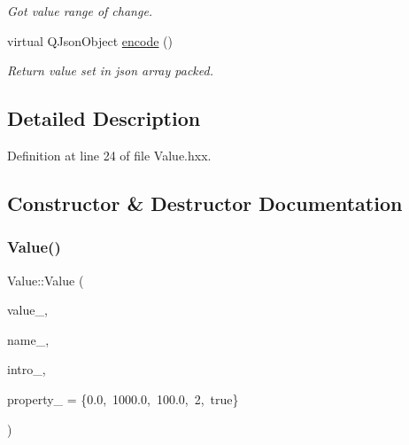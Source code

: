 \begin{DoxyCompactItemize}
\begin{DoxyCompactList}\small\item\em Got value range of change. \end{DoxyCompactList}\item 
\mbox{\label{classeven_1_1_value_af3d95249153710e93b08bfb8627f068d}} 
virtual Q\+Json\+Object \mbox{\hyperlink{classeven_1_1_value_af3d95249153710e93b08bfb8627f068d}{encode}} ()
\begin{DoxyCompactList}\small\item\em Return value set in json array packed. \end{DoxyCompactList}\end{DoxyCompactItemize}


\subsection{Detailed Description}


Definition at line 24 of file Value.\+hxx.



\subsection{Constructor \& Destructor Documentation}
\mbox{\label{classeven_1_1_value_ace4f4181daf48486843667d315f0d391}} 
\subsubsection{\texorpdfstring{Value()}{Value()}\hspace{0.1cm}{\footnotesize\ttfamily [1/4]}}
{\footnotesize\ttfamily Value\+::\+Value (\begin{DoxyParamCaption}\item[{int}]{value\+\_\+,  }\item[{const Q\+String \&}]{name\+\_\+,  }\item[{const Q\+String \&}]{intro\+\_\+,  }\item[{\mbox{\hyperlink{structeven_1_1_value_1_1_property}{Value\+::\+Property}}}]{property\+\_\+ = {\ttfamily \{0.0,~1000.0,~100.0,~2,~true\}} }\end{DoxyParamCaption})}



